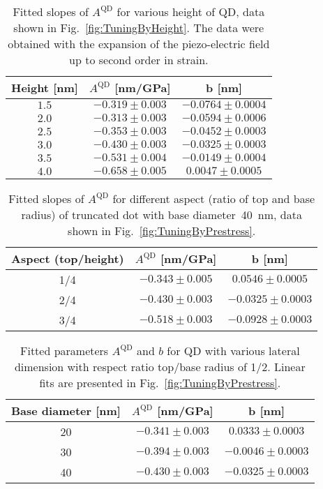  		\begin{table}[ht!]
 			\centering
 			\caption{Fitted slopes of $A^{\mathrm{QD}}$ for various height of QD, data shown in Fig.~\ref{fig:TuningByHeight}. The data were obtained with the expansion of the piezo-electric field up to second order in strain.}
 			\label{tab:height_slopes}
 			\begin{tabular}{|c|c|c|}
 				\hline
 				Height [nm]		& $A^{\mathrm{QD}}$ [nm/GPa]    & b   [nm]    \\ \hline
 			 $1.5$  &$-0.319 \pm 0.003$  & $-0.0764 \pm 0.0004$     \\ \hline
 			$2.0$	&$-0.313 \pm 0.003$  & $-0.0594 \pm 0.0006$      \\ \hline
 			 $2.5$  &$-0.353 \pm 0.003$  & $-0.0452\pm 0.0003$     \\ \hline
 			 $3.0$	&$-0.430 \pm 0.003$  & $-0.0325 \pm 0.0003$      \\ \hline
 			 $3.5$  &$-0.531 \pm 0.004$  & $-0.0149\pm 0.0004$     \\ \hline
 			 $4.0$	&$-0.658 \pm 0.005$  & $0.0047 \pm 0.0005$      \\ \hline
 			\end{tabular}    
 		\end{table}
 		


 		
 		
 		
 		\begin{table}[ht!]
 			\centering
 			\caption{Fitted slopes of $A^{\mathrm{QD}}$ for different aspect (ratio of top and base radius) of truncated dot with base diameter~40~nm, data shown in Fig.~\ref{fig:TuningByPrestress}.}
 			\label{tab:aspect_slopes}
 			\begin{tabular}{|c|c|c|}
 				\hline
 				Aspect (top/height) 	& $A^{\mathrm{QD}}$ [nm/GPa]    & b   [nm]    \\ \hline
 				1/4	&$-0.343\pm0.005$ &	$0.0546	\pm	0.0005$\\ \hline
 				2/4	&$-0.430\pm0.003$ &	$-0.0325 \pm		0.0003$\\ \hline
 				3/4	&$-0.518\pm0.003$ &	$-0.0928	\pm 0.0003$\\ \hline
 			\end{tabular}    
 		\end{table}
 		
 		\begin{table}[ht!]
 			\centering
 			\caption{Fitted parameters $A^{\mathrm{QD}}$ and $b$ for QD with various lateral dimension with respect ratio top/base radius of 1/2. Linear fits are presented in Fig.~\ref{fig:TuningByPrestress}.}
 			\label{tab:lateral_slopes}
 			\begin{tabular}{|c|c|c|}
 				\hline
 				Base diameter [nm]	& $A^{\mathrm{QD}}$ [nm/GPa]    & b   [nm]    \\ \hline
			20&	$-0.341\pm0.003$&	$0.0333\pm		0.0003$\\ \hline
			30&	$-0.394\pm0.003$&	$-0.0046\pm	0.0003$\\ \hline
			40&	$-0.430\pm0.003$&	$-0.0325	\pm	0.0003$ \\ \hline
 			\end{tabular}    
 		\end{table}
 		
